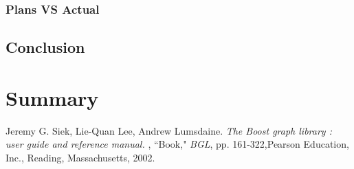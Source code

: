 \documentclass[a4paper, 12pt, english]{book}
\begin{document}
\subsection{Plans VS Actual}
\section{Conclusion}
\chapter{Summary}
\begin{thebibliography}{12}
Jeremy G. Siek,
Lie-Quan Lee, Andrew Lumsdaine.
\textit{The Boost graph library : user guide and reference manual.} , ``Book," \emph{BGL}, pp. 161-322,Pearson Education, Inc., Reading, Massachusetts, 2002.
\end{thebibliography}
\end{document}
